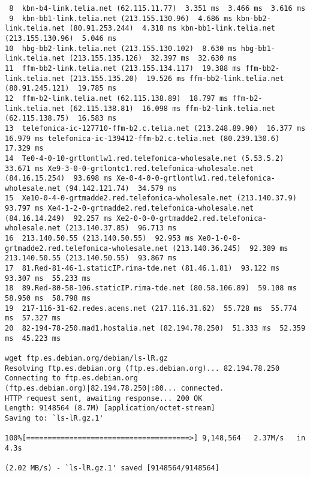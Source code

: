\documentclass{acm_proc_article-sp}
\begin{document}
\begin{verbatim}
 8  kbn-b4-link.telia.net (62.115.11.77)  3.351 ms  3.466 ms  3.616 ms
 9  kbn-bb1-link.telia.net (213.155.130.96)  4.686 ms kbn-bb2-link.telia.net (80.91.253.244)  4.318 ms kbn-bb1-link.telia.net (213.155.130.96)  5.046 ms
10  hbg-bb2-link.telia.net (213.155.130.102)  8.630 ms hbg-bb1-link.telia.net (213.155.135.126)  32.397 ms  32.630 ms
11  ffm-bb2-link.telia.net (213.155.134.117)  19.388 ms ffm-bb2-link.telia.net (213.155.135.20)  19.526 ms ffm-bb2-link.telia.net (80.91.245.121)  19.785 ms
12  ffm-b2-link.telia.net (62.115.138.89)  18.797 ms ffm-b2-link.telia.net (62.115.138.81)  16.098 ms ffm-b2-link.telia.net (62.115.138.75)  16.583 ms
13  telefonica-ic-127710-ffm-b2.c.telia.net (213.248.89.90)  16.377 ms  16.979 ms telefonica-ic-139412-ffm-b2.c.telia.net (80.239.130.6)  17.329 ms
14  Te0-4-0-10-grtlontlw1.red.telefonica-wholesale.net (5.53.5.2)  33.671 ms Xe9-3-0-0-grtlontc1.red.telefonica-wholesale.net (84.16.15.254)  93.698 ms Xe-0-4-0-0-grtlontlw1.red.telefonica-wholesale.net (94.142.121.74)  34.579 ms
15  Xe10-0-4-0-grtmadde2.red.telefonica-wholesale.net (213.140.37.9)  93.797 ms Xe4-1-2-0-grtmadde2.red.telefonica-wholesale.net (84.16.14.249)  92.257 ms Xe2-0-0-0-grtmadde2.red.telefonica-wholesale.net (213.140.37.85)  96.713 ms
16  213.140.50.55 (213.140.50.55)  92.953 ms Xe0-1-0-0-grtmadde2.red.telefonica-wholesale.net (213.140.36.245)  92.389 ms 213.140.50.55 (213.140.50.55)  93.867 ms
17  81.Red-81-46-1.staticIP.rima-tde.net (81.46.1.81)  93.122 ms  93.307 ms  55.233 ms
18  89.Red-80-58-106.staticIP.rima-tde.net (80.58.106.89)  59.108 ms  58.950 ms  58.798 ms
19  217-116-31-62.redes.acens.net (217.116.31.62)  55.728 ms  55.774 ms  57.327 ms
20  82-194-78-250.mad1.hostalia.net (82.194.78.250)  51.333 ms  52.359 ms  45.223 ms

wget ftp.es.debian.org/debian/ls-lR.gz
Resolving ftp.es.debian.org (ftp.es.debian.org)... 82.194.78.250
Connecting to ftp.es.debian.org (ftp.es.debian.org)|82.194.78.250|:80... connected.
HTTP request sent, awaiting response... 200 OK
Length: 9148564 (8.7M) [application/octet-stream]
Saving to: `ls-lR.gz.1'

100%[======================================>] 9,148,564   2.37M/s   in 4.3s    

(2.02 MB/s) - `ls-lR.gz.1' saved [9148564/9148564]
\end{verbatim}
\end{document}
